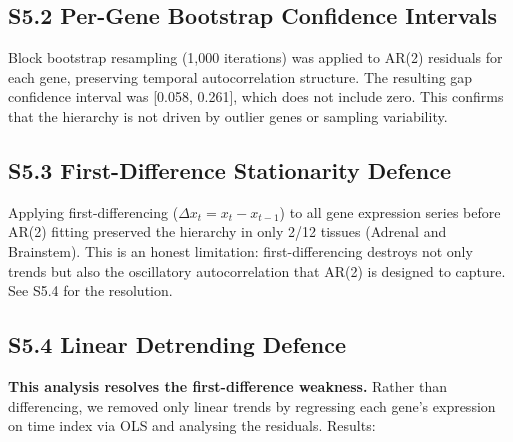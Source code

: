 \documentclass[11pt,a4paper]{article}
\begin{document}
\subsection{S5.2 Per-Gene Bootstrap Confidence Intervals}

Block bootstrap resampling (1,000 iterations) was applied to AR(2) residuals for each gene, preserving temporal autocorrelation structure. The resulting gap confidence interval was [0.058, 0.261], which does not include zero. This confirms that the hierarchy is not driven by outlier genes or sampling variability.

\subsection{S5.3 First-Difference Stationarity Defence}

Applying first-differencing ($\Delta x_t = x_t - x_{t-1}$) to all gene expression series before AR(2) fitting preserved the hierarchy in only 2/12 tissues (Adrenal and Brainstem). This is an honest limitation: first-differencing destroys not only trends but also the oscillatory autocorrelation that AR(2) is designed to capture. See S5.4 for the resolution.

\subsection{S5.4 Linear Detrending Defence}

\textbf{This analysis resolves the first-difference weakness.} Rather than differencing, we removed only linear trends by regressing each gene's expression on time index via OLS and analysing the residuals. Results:
\end{document}
